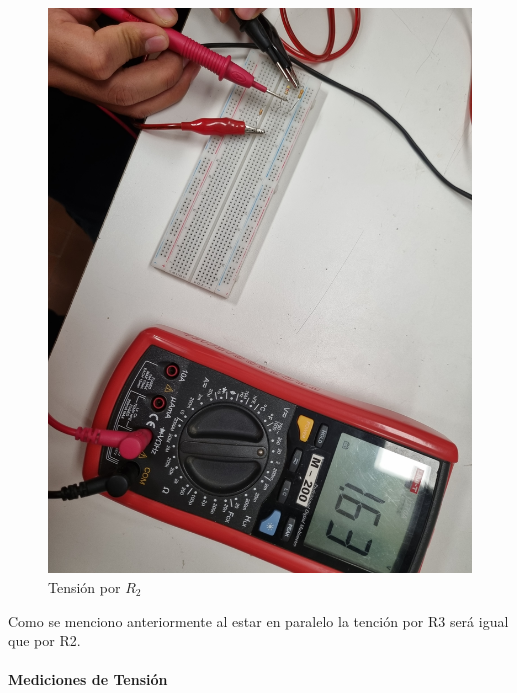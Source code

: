 \documentclass[a4paper,12pt]{article}
\begin{document}
\begin{figure}[H]
\begin{minipage}{0.40\textwidth}
        \includegraphics[width=\linewidth]{imagenes/tensioni2.jpg}
        \caption*{Tensión por $R_2$}
    \end{minipage}
\end{figure}

Como se menciono anteriormente al estar en paralelo la tención por R3 será igual que por R2.

\vspace{0.5cm}

\paragraph{Mediciones de Tensión}
\paragraph{}
\end{document}
